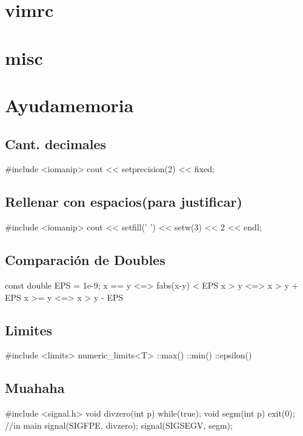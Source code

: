 {\section{vimrc}

\section{misc}


\section{Ayudamemoria}%
\subsection*{Cant. decimales} 	
\begin{code}
#include <iomanip>
cout << setprecision(2) << fixed;
\end{code}
\subsection*{Rellenar con espacios(para justificar)}
\begin{code}
#include <iomanip>
cout << setfill(' ') << setw(3) << 2 << endl;
\end{code}
\subsection*{Comparación de Doubles}
\begin{code}
const double EPS = 1e-9;
x == y	<=> fabs(x-y) < EPS
x >  y	<=> x > y + EPS
x >= y	<=> x > y - EPS
\end{code}
\subsection*{Limites}
\begin{code}
#include <limits>
numeric_limits<T>
	::max()
	::min()
	::epsilon()
\end{code}
\subsection*{Muahaha}
\begin{code}
#include <signal.h>
void divzero(int p){
	while(true);}
void segm(int p){
	exit(0);}
//in main
signal(SIGFPE, divzero);
signal(SIGSEGV, segm);
\end{code}
}
